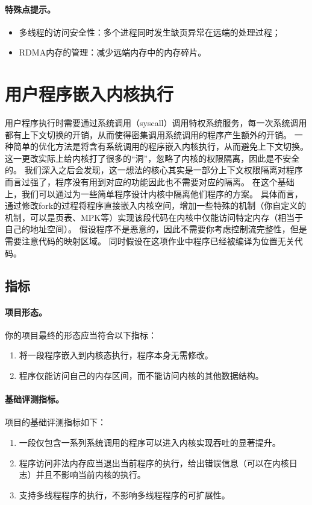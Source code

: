 \paragraph*{特殊点提示。}
\begin{itemize}
    \item 多线程的访问安全性：多个进程同时发生缺页异常在远端的处理过程；
    \item RDMA内存的管理：减少远端内存中的内存碎片。
\end{itemize}

\section{用户程序嵌入内核执行}
用户程序执行时需要通过系统调用（syscall）调用特权系统服务，每一次系统调用都有上下文切换的开销，从而使得密集调用系统调用的程序产生额外的开销。
一种简单的优化方法是将含有系统调用的程序嵌入内核执行，从而避免上下文切换。
这一更改实际上给内核打了很多的“洞”，忽略了内核的权限隔离，因此是不安全的。
我们深入之后会发现，这一想法的核心其实是一部分上下文权限隔离对程序而言过强了，程序没有用到对应的功能因此也不需要对应的隔离。
在这个基础上，我们可以通过为一些简单程序设计内核中隔离他们程序的方案。
具体而言，通过修改fork的过程将程序直接嵌入内核空间，增加一些特殊的机制（你自定义的机制，可以是页表、MPK等）实现该段代码在内核中仅能访问特定内存（相当于自己的地址空间）。
假设程序不是恶意的，因此不需要你考虑控制流完整性，但是需要注意代码的映射区域。
同时假设在这项作业中程序已经被编译为位置无关代码。


\subsection{指标}
\paragraph*{项目形态。}
你的项目最终的形态应当符合以下指标：
\begin{enumerate}
    \item 将一段程序嵌入到内核态执行，程序本身无需修改。
    \item 程序仅能访问自己的内存区间，而不能访问内核的其他数据结构。
\end{enumerate}

\paragraph*{基础评测指标。}
项目的基础评测指标如下：
\begin{enumerate}
    \item 一段仅包含一系列系统调用的程序可以进入内核实现吞吐的显著提升。
    \item 程序访问非法内存应当退出当前程序的执行，给出错误信息（可以在内核日志）并且不影响当前内核的执行。
    \item 支持多线程程序的执行，不影响多线程程序的可扩展性。
\end{enumerate}



